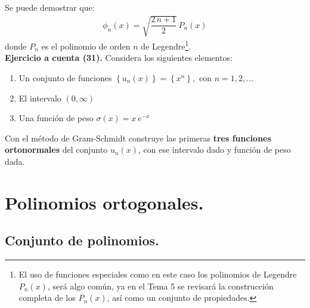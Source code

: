 Se puede demostrar que:
\begin{align}
\phi_{n}(x) = \sqrt{\dfrac{2 \, n + 1}{2}} \, P_{n}(x)
\label{eq:ecuacion_10_60}
\end{align}
donde $P_{n}$ es el polinomio de orden $n$ de Legendre\footnote{El uso de funciones especiales como en este caso los polinomios de Legendre $P_{n}(x)$, será algo común, ya en el Tema 5 se revisará la construcción completa de los $P_{n}(x)$, así como un conjunto de propiedades.}.
\\[0.5em]
\noindent
\textbf{Ejercicio a cuenta (31). } Considera los siguientes elementos:
\begin{enumerate}[label=\alph*)]
\item Un conjunto de funciones $\left\{ u_{n} (x) \right\} = \left\{ x^{n} \right\}, \mbox{ con } n = 1, 2, \ldots$
\item El intervalo $(0, \infty)$
\item Una función de peso $\sigma (x) = x \, e^{-x}$
\end{enumerate}
Con el método de Gram-Schmidt construye las primeras \textbf{tres funciones ortonormales} del conjunto $u_{n}(x)$, con ese intervalo dado y función de peso dada.

\section{Polinomios ortogonales.}
\subsection{Conjunto de polinomios.}

